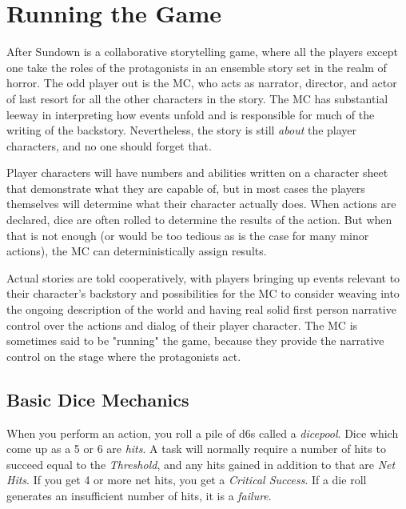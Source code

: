 \chapter{Running the Game}

\hspace{\parindent} After Sundown is a collaborative storytelling game, where all the players except one take the roles of the protagonists in an ensemble story set in the realm of horror. The odd player out is the MC, who acts as narrator, director, and actor of last resort for all the other characters in the story. The MC has substantial leeway in interpreting how events unfold and is responsible for much of the writing of the backstory. Nevertheless, the story is still \textit{about} the player characters, and no one should forget that.

Player characters will have numbers and abilities written on a character sheet that demonstrate what they are capable of, but in most cases the players themselves will determine what their character actually does. When actions are declared, dice are often rolled to determine the results of the action. But when that is not enough (or would be too tedious as is the case for many minor actions), the MC can deterministically assign results.

Actual stories are told cooperatively, with players bringing up events relevant to their character's backstory and possibilities for the MC to consider weaving into the ongoing description of the world and having real solid first person narrative control over the actions and dialog of their player character. The MC is sometimes said to be "running" the game, because they provide the narrative control on the stage where the protagonists act. 

\section{Basic Dice Mechanics}

\hspace{\parindent} When you perform an action, you roll a pile of d6s called a \textit{dicepool}. Dice which come up as a 5 or 6 are \textit{hits}. A task will normally require a number of hits to succeed equal to the \textit{Threshold}, and any hits gained in addition to that are \textit{Net Hits}. If you get 4 or more net hits, you get a \textit{Critical Success}. If a die roll generates an insufficient number of hits, it is a \textit{failure}.

